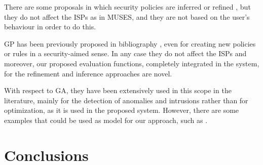 There are some proposals in which security policies are inferred or refined \cite{inferring_policies_socialnetworks_09,policy_generation_clustering_10}, but they do not affect the ISPs as in MUSES, and they are not based on the user's behaviour in order to do this.

GP has been previously proposed in bibliography \cite{rule_generation_gp_09,sec_policy_evolution_gp_08}, even for creating new policies or rules in a security-aimed sense. In any case they do not affect the ISPs and moreover, our proposed evaluation functions, completely integrated in the system, for the refinement and inference approaches are novel.

With respect to GA, they have been extensively used in this scope in the literature, mainly for the detection of anomalies and intrusions rather than for optimization, as it is used in the proposed system. However, there are some examples that could be used as model for our approach, such as \cite{EAs_securitycosts-kirta,risk_reduction_ga_12}.

\section{Conclusions}
\label{sec:sota_conclusions}
